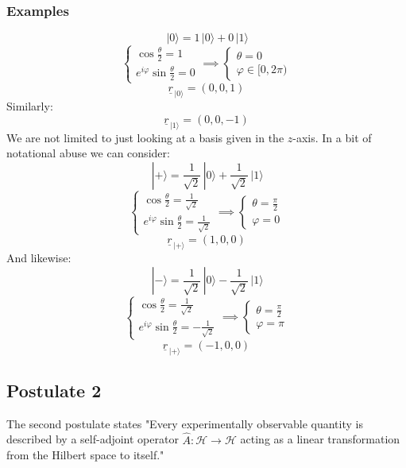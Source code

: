 \documentclass[12pt]{article}
\newcommand{\ket}[1]{\,|#1\rangle}
\begin{document}
\subsubsection*{Examples}
\[\ket{0}=1\ket{0}+0\ket{1}\]
\[\begin{cases}
    \cos\frac{\theta}{2}=1 \\
    e^{i\varphi}\sin\frac{\theta}{2}=0
\end{cases}\implies \begin{cases}
    \theta =0 \\
    \varphi\in [0,2\pi)
\end{cases}\]
\[\underline{r}_{\ket{0}}=(0,0,1)\]
Similarly:
\[\underline{r}_{\ket{1}}=(0,0,-1)\]
We are not limited to just looking at a basis given in the \(z\)-axis. In a bit of notational abuse we can consider:
\[\ket{+}=\frac{1}{\sqrt{2}}\ket{0}+\frac{1}{\sqrt{2}}\ket{1}\]
\[\begin{cases}
    \cos{\frac{\theta}{2}}=\frac{1}{\sqrt{2}} \\
    e^{i\varphi}\sin\frac{\theta}{2}=\frac{1}{\sqrt{2}}
\end{cases}\implies \begin{cases}
    \theta=\frac{\pi}{2} \\
    \varphi=0
\end{cases}\]
\[\underline{r}_{\ket{+}}=(1,0,0)\]
And likewise:
\[\ket{-}=\frac{1}{\sqrt{2}}\ket{0}-\frac{1}{\sqrt{2}}\ket{1}\]
\[\begin{cases}
    \cos{\frac{\theta}{2}}=\frac{1}{\sqrt{2}} \\
    e^{i\varphi}\sin\frac{\theta}{2}=-\frac{1}{\sqrt{2}}
\end{cases}\implies \begin{cases}
    \theta=\frac{\pi}{2} \\
    \varphi=\pi
\end{cases}\]
\[\underline{r}_{\ket{+}}=(-1,0,0)\]
\subsection*{Postulate 2}
The second postulate states "Every experimentally observable quantity is described by a self-adjoint operator \(\hat{A}:\mathcal{H}\to\mathcal{H}\) acting as a linear transformation from the Hilbert space to itself."
\end{document}
